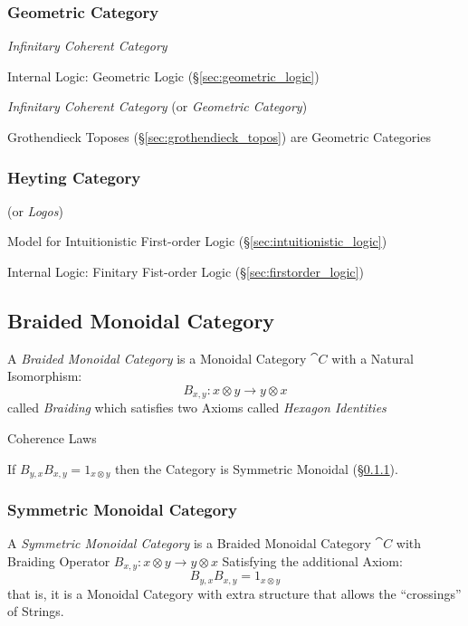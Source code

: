 \subsubsection{Geometric Category}\label{sec:geometric_category}

\emph{Infinitary Coherent Category}

Internal Logic: Geometric Logic (\S\ref{sec:geometric_logic})

\emph{Infinitary Coherent Category} (or \emph{Geometric Category})

Grothendieck Toposes (\S\ref{sec:grothendieck_topos}) are Geometric
Categories



\subsubsection{Heyting Category}\label{sec:heyting_category}

(or \emph{Logos})

Model for Intuitionistic First-order Logic
(\S\ref{sec:intuitionistic_logic})

Internal Logic: Finitary Fist-order Logic
(\S\ref{sec:firstorder_logic})



\subsection{Braided Monoidal Category}\label{sec:braided_monoidal}

A \emph{Braided Monoidal Category} is a Monoidal Category $\cat{C}$
with a Natural Isomorphism:
\[
  B_{x,y} : x \otimes y \rightarrow y \otimes x
\]
called \emph{Braiding} which satisfies two Axioms called \emph{Hexagon
  Identities} %

Coherence Laws

If $B_{y,x} B_{x,y} = 1_{x \otimes y}$ then the Category is Symmetric
Monoidal (\S\ref{sec:symmetric_monoidal}).



\subsubsection{Symmetric Monoidal Category}\label{sec:symmetric_monoidal}

A \emph{Symmetric Monoidal Category} is a Braided Monoidal Category
$\cat{C}$ with Braiding Operator $B_{x,y} : x \otimes y \rightarrow y
\otimes x$ Satisfying the additional Axiom:
\[
  B_{y,x} B_{x,y} = 1_{x \otimes y}
\]
that is, it is a Monoidal Category with extra structure that allows
the ``crossings'' of Strings.

